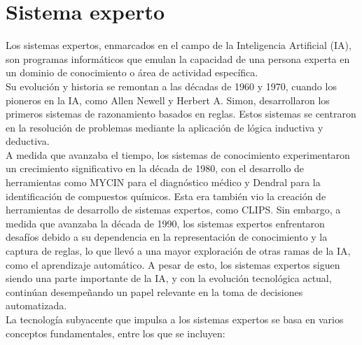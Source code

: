 \section{Sistema experto}
\cite{innovaciondigital360SistemasExpertos}
Los sistemas expertos, enmarcados en el campo de la Inteligencia Artificial
(IA), son programas informáticos que emulan la capacidad de una persona experta
en un dominio de conocimiento o área de actividad específica.
\\
Su evolución y historia se remontan a las décadas de 1960 y 1970, cuando los
pioneros en la IA, como Allen Newell y Herbert A. Simon, desarrollaron los
primeros sistemas de razonamiento basados en reglas. Estos sistemas se centraron
en la resolución de problemas mediante la aplicación de lógica inductiva y
deductiva.
\\
A medida que avanzaba el tiempo, los sistemas de conocimiento experimentaron un
crecimiento significativo en la década de 1980, con el desarrollo de
herramientas como MYCIN para el diagnóstico médico y Dendral para la
identificación de compuestos químicos. Esta era también vio la creación de
herramientas de desarrollo de sistemas expertos, como CLIPS. Sin embargo, a
medida que avanzaba la década de 1990, los sistemas expertos enfrentaron
desafíos debido a su dependencia en la representación de conocimiento y la
captura de reglas, lo que llevó a una mayor exploración de otras ramas de la IA,
como el aprendizaje automático. A pesar de esto, los sistemas expertos siguen
siendo una parte importante de la IA, y con la evolución tecnológica actual,
continúan desempeñando un papel relevante en la toma de decisiones automatizada.
\\
La tecnología subyacente que impulsa a los sistemas expertos se basa en varios conceptos fundamentales, entre los que se incluyen:
